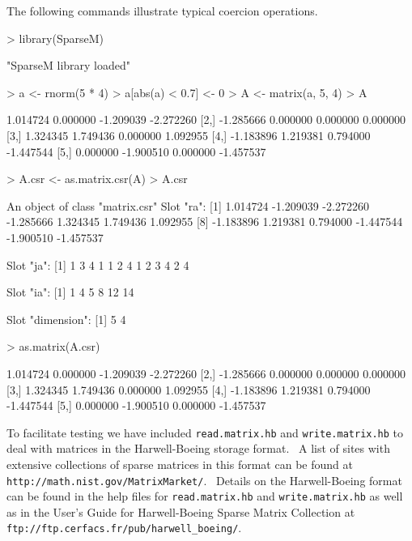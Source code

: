 \documentclass{article}
\begin{document}
The following commands illustrate typical coercion operations.

\begin{Schunk}
\begin{Sinput}
> library(SparseM)
\end{Sinput}
\begin{Soutput}
[1] "SparseM library loaded"
\end{Soutput}
\begin{Sinput}
> a <- rnorm(5 * 4)
> a[abs(a) < 0.7] <- 0
> A <- matrix(a, 5, 4)
> A
\end{Sinput}
\begin{Soutput}
          [,1]      [,2]      [,3]      [,4]
[1,]  1.014724  0.000000 -1.209039 -2.272260
[2,] -1.285666  0.000000  0.000000  0.000000
[3,]  1.324345  1.749436  0.000000  1.092955
[4,] -1.183896  1.219381  0.794000 -1.447544
[5,]  0.000000 -1.900510  0.000000 -1.457537
\end{Soutput}
\begin{Sinput}
> A.csr <- as.matrix.csr(A)
> A.csr
\end{Sinput}
\begin{Soutput}
An object of class "matrix.csr"
Slot "ra":
 [1]  1.014724 -1.209039 -2.272260 -1.285666  1.324345  1.749436  1.092955
 [8] -1.183896  1.219381  0.794000 -1.447544 -1.900510 -1.457537

Slot "ja":
 [1] 1 3 4 1 1 2 4 1 2 3 4 2 4

Slot "ia":
[1]  1  4  5  8 12 14

Slot "dimension":
[1] 5 4
\end{Soutput}
\begin{Sinput}
> as.matrix(A.csr)
\end{Sinput}
\begin{Soutput}
          [,1]      [,2]      [,3]      [,4]
[1,]  1.014724  0.000000 -1.209039 -2.272260
[2,] -1.285666  0.000000  0.000000  0.000000
[3,]  1.324345  1.749436  0.000000  1.092955
[4,] -1.183896  1.219381  0.794000 -1.447544
[5,]  0.000000 -1.900510  0.000000 -1.457537
\end{Soutput}
\end{Schunk}
To facilitate testing we have included \texttt{read.matrix.hb} 
and \texttt{write.matrix.hb} to deal with matrices
in the Harwell-Boeing storage format.  \ A list of sites with
extensive collections of sparse matrices  in this format can be found at
\texttt{http://math.nist.gov/MatrixMarket/}. \ Details on the Harwell-Boeing format can
be found in the help files for \texttt{read.matrix.hb} and \texttt{write.matrix.hb} as well
as in the User's Guide for Harwell-Boeing Sparse Matrix Collection at
\texttt{ftp://ftp.cerfacs.fr/pub/harwell\_boeing/}.
\end{document}
